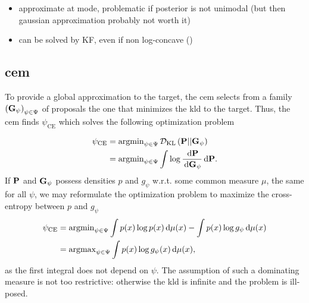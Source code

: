 \begin{itemize}
    \item approximate at mode, problematic if posterior is not unimodal (but then gaussian approximation probably not worth it)
    \item can be solved by KF, even if non log-concave ()
\end{itemize}

\subsection{\texorpdfstring{\Acrfull{cem}}{Cross-entropy method}}
To provide a global approximation to the target, the \gls{cem}\cite{Rubinstein1999CrossEntropy,Rubinstein2004CrossEntropy} selects from a family $ \left( \G_{\psi} \right)_{\psi \in \Psi}$ of proposals the one that minimizes the \gls{kld} to the target. Thus, the \gls{cem} finds $\psi_{\text{CE}}$ which solves the following optimization problem

\begin{align*}
    \psi_{\text{CE}} &= \argmin_{\psi \in \Psi} \Dkl{\P}{\G_{\psi}} \\
    &= \argmin_{\psi \in \Psi} \int \log \frac{\d \P}{\d\G_{\psi}} \d \P.
\end{align*}
If $\P$ and $\G_{\psi}$ possess densities $p$ and $g_{\psi}$ w.r.t. some common measure $\mu$, the same for all $\psi$, we may reformulate the optimization problem to maximize the cross-entropy between $p$ and $g_{\psi}$
\begin{align}
    \psi_{\text{CE}} &= \argmin_{\psi \in \Psi} \int  p(x)\log p(x) \d \mu(x) - \int p(x)\log g_{\psi} \d \mu(x) \nonumber\\ 
    &= \argmax_{\psi \in \Psi} \int p(x) \log g_{\psi}(x) \d \mu(x), \label{eq:ce_argmax}
\end{align}
as the first integral does not depend on $\psi$. The assumption of such a dominating measure is not too restrictive: otherwise the \gls{kld} is infinite and the problem is ill-posed.

